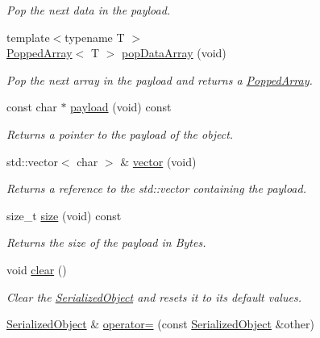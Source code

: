 \begin{DoxyCompactItemize}
\begin{DoxyCompactList}\small\item\em Pop the next data in the payload. \end{DoxyCompactList}\item 
{\footnotesize template$<$typename T $>$ }\\\mbox{\hyperlink{classbas_1_1PoppedArray}{Popped\+Array}}$<$ T $>$ \mbox{\hyperlink{classbas_1_1SerializedObject_a700a5ad3f53a5e12e51321f29e79e422}{pop\+Data\+Array}} (void)
\begin{DoxyCompactList}\small\item\em Pop the next array in the payload and returns a \mbox{\hyperlink{classbas_1_1PoppedArray}{Popped\+Array}}. \end{DoxyCompactList}\item 
const char $\ast$ \mbox{\hyperlink{classbas_1_1SerializedObject_a975760dac48a3c581e5e3632f6781856}{payload}} (void) const
\begin{DoxyCompactList}\small\item\em Returns a pointer to the payload of the object. \end{DoxyCompactList}\item 
std\+::vector$<$ char $>$ \& \mbox{\hyperlink{classbas_1_1SerializedObject_aa2e206649520759e7d6493b0122a9988}{vector}} (void)
\begin{DoxyCompactList}\small\item\em Returns a reference to the std\+::vector containing the payload. \end{DoxyCompactList}\item 
size\+\_\+t \mbox{\hyperlink{classbas_1_1SerializedObject_a827e920a13f1294b165c2b54e73277f9}{size}} (void) const
\begin{DoxyCompactList}\small\item\em Returns the size of the payload in Bytes. \end{DoxyCompactList}\item 
void \mbox{\hyperlink{classbas_1_1SerializedObject_a538908b313a8482b28a099f2f6257300}{clear}} ()
\begin{DoxyCompactList}\small\item\em Clear the \mbox{\hyperlink{classbas_1_1SerializedObject}{Serialized\+Object}} and resets it to its default values. \end{DoxyCompactList}\item 
\mbox{\hyperlink{classbas_1_1SerializedObject}{Serialized\+Object}} \& \mbox{\hyperlink{classbas_1_1SerializedObject_adcd56daab2c57709b134c4aa3df91c06}{operator=}} (const \mbox{\hyperlink{classbas_1_1SerializedObject}{Serialized\+Object}} \&other)

\end{DoxyCompactItemize}
